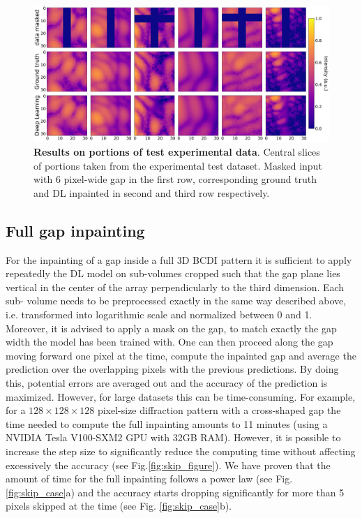 \begin{figure}[h]
    \centering
    \includegraphics[width=\textwidth]{figures/Inpainting/prediction_small_experiment.pdf}
    \caption{\textbf{Results on portions of test experimental data}. Central slices of portions taken from the experimental test
    dataset. Masked input with 6 pixel-wide gap in the first row, corresponding ground truth and DL inpainted in second and third
    row respectively.}
    \label{fig:pred_portions_exp}
\end{figure}

\subsection{Full gap inpainting}

For the inpainting of a gap inside a full 3D BCDI pattern it is sufficient to apply repeatedly the DL model on sub-volumes 
cropped such that the gap plane lies vertical in the center of the array perpendicularly to the third dimension. Each sub-
volume needs to be preprocessed exactly in the same way described above, i.e. transformed into logarithmic scale and 
normalized between 0 and 1. Moreover, it is advised to apply a mask on the gap, to match exactly the gap width the model
has been trained with. 
One can then proceed along the gap moving forward one pixel at the time, compute the inpainted gap and average the prediction
over the overlapping pixels with the previous predictions. By doing this, potential errors are averaged out and the accuracy
of the prediction is maximized. However, for large datasets this can be time-consuming. For example, for a $128\times128\times128$ pixel-size
diffraction pattern with a cross-shaped gap the time needed to compute the full inpainting amounts to 11 minutes (using a 
NVIDIA Tesla V100-SXM2 GPU with 32GB RAM). However, it is possible to increase the step size to significantly reduce the computing
time without affecting excessively the accuracy (see Fig.\ref{fig:skip_figure}). We have proven that the amount of time for the full inpainting follows a power 
law (see Fig. \ref{fig:skip_case}a) and the accuracy starts dropping significantly for more than 5 pixels skipped at the time
(see Fig. \ref{fig:skip_case}b).  

